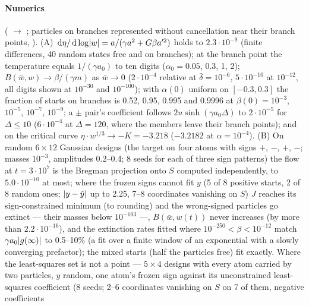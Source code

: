 \begin{sloppypar}
\paragraph{Numerics} ( $\to$ ; particles on branches
represented without cancellation near their branch points, ). (A)
$\,\mathrm{d}\eta/\,\mathrm{d}\log\lvert w\rvert = a/(\gamma a^2 + G\beta a'^2)$ holds to $2.3\cdot10^{-9}$ (finite differences, 40 random states
free and on branches); at the branch point the temperature equals $1/(\gamma a_0)$ to ten digits ($\alpha_0 = 0.05$,
0.3, 1, 2); $B(\bar w,w)\to\beta/(\gamma m)$ as $\bar w\to0$ ($2\cdot10^{-4}$ relative at $\bar\delta = 10^{-6}$,
$5\cdot10^{-10}$ at $10^{-12}$, all digits shown at $10^{-30}$ and $10^{-100}$); with $\alpha(0)$ uniform on
$[-0.3,0.3]$ the fraction of starts on branches is 0.52, 0.95, 0.995 and 0.9996 at $\beta(0) = 10^{-3}$, $10^{-5}$,
$10^{-7}$, $10^{-9}$; a $\pm$ pair's coefficient follows $2u\sinh(\gamma a_0\Delta)$ to $2\cdot10^{-5}$ for
$\Delta\le10$ ($6\cdot10^{-4}$ at $\Delta = 120$, where the members leave their branch points); and on the critical
curve $\eta\cdot w^{1/3}\to-K = -3.218$ ($-3.2182$ at $\alpha = 10^{-4}$). (B) On random $6\times12$ Gaussian designs
(the target on four atoms with signs $+$, $-$, $+$, $-$; masses $10^{-3}$, amplitudes 0.2--0.4; 8 seeds for each of
three sign patterns) the flow at $t = 3\cdot10^7$ is the Bregman projection onto $S$ computed independently, to
$5.0\cdot10^{-10}$ at most; where the frozen signs cannot fit $y$ (5 of 8 positive starts, 2 of 8 random ones;
$\lvert y - \hat y\rvert$ up to 2.25, 7--8 coordinates vanishing on $S$) $J$ reaches its sign-constrained minimum (to rounding)
and the wrong-signed particles go extinct --- their masses below $10^{-103}$ ---, $B(\bar w,w(t))$ never increases (by
more than $2.2\cdot10^{-16}$), and the extinction rates fitted where $10^{-250} < \beta < 10^{-12}$ match
$\gamma a_0\lvert g(\infty)\rvert$ to 0.5--10\% (a fit over a finite window of an exponential with a slowly converging
prefactor); the mixed starts (half the particles free) fit exactly. Where the least-squares set is not a point ---
$5\times4$ designs with every atom carried by two particles, $y$ random, one atom's frozen sign against its
unconstrained least-squares coefficient (8 seeds; 2--6 coordinates vanishing on $S$ on 7 of them, negative coefficients

\end{sloppypar}
